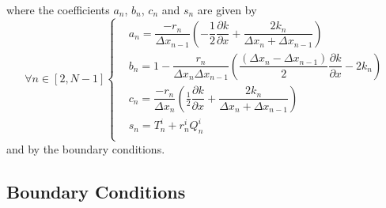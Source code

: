 \documentclass[]{interact}
\theoremstyle{plain}%
\theoremstyle{definition}
\theoremstyle{remark}
\begin{document}
where the coefficients $a_n$, $b_n$, $c_n$ and $s_n$ are given by
\begin{equation}
\forall n \in [2, N-1] 
\begin{cases}
& a_n =   \dfrac{-r_n}{\Delta x_{n-1}} \left( - \dfrac{1}{2} \dfrac{\partial k}{ \partial x} + \dfrac{2 k_n}{\Delta x_n + \Delta x_{n-1}} \right) \\
& b_n = 1 - \dfrac{r_n}{\Delta x_{n}\Delta x_{n-1}} \left( \dfrac{\left(\Delta x_{n}- \Delta x_{n-1} \right)}{2} \dfrac{\partial k}{ \partial x} - 2 k_n \right) \\
& c_n =  \dfrac{-r_n}{\Delta x_{n}} \left( \frac{1}{2} \dfrac{\partial k}{ \partial x} + \dfrac{2 k_n}{\Delta x_n + \Delta x_{n-1}} \right)\\
& s_n = T_n^i + r_n^i Q_n^i\\
\end{cases}
\end{equation}
and by the boundary conditions.


\subsection{Boundary Conditions}
\end{document}
